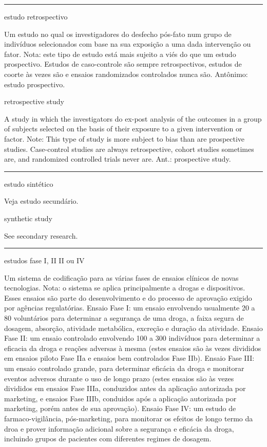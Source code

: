\documentclass[
  openany]{book}
\begin{document}
\begin{center}\rule{0.5\linewidth}{0.5pt}\end{center}

estudo retrospectivo

Um estudo no qual os investigadores do desfecho pós-fato num grupo de indivíduos selecionados com base na sua exposição a uma dada intervenção ou fator. Nota: este tipo de estudo está mais sujeito a viés do que um estudo prospectivo. Estudos de caso-controle são sempre retrospectivos, estudos de coorte às vezes são e ensaios randomizados controlados nunca são. Antônimo: estudo prospectivo.

retrospective study

A study in which the investigators do ex-post analysis of the outcomes in a group of subjects selected on the basis of their exposure to a given intervention or factor. Note: This type of study is more subject to bias than are prospective studies. Case-control studies are always retrospective, cohort studies sometimes are, and randomized controlled trials never are. Ant.: prospective study.

\begin{center}\rule{0.5\linewidth}{0.5pt}\end{center}

estudo sintético

Veja estudo secundário.

synthetic study

See secondary research.

\begin{center}\rule{0.5\linewidth}{0.5pt}\end{center}

estudos fase I, II II ou IV

Um sistema de codificação para as várias fases de ensaios clínicos de novas tecnologias. Nota: o sistema se aplica principalmente a drogas e dispositivos. Esses ensaios são parte do desenvolvimento e do processo de aprovação exigido por agências regulatórias. Ensaio Fase I: um ensaio envolvendo usualmente 20 a 80 voluntários para determinar a segurança de uma droga, a faixa segura de dosagem, absorção, atividade metabólica, excreção e duração da atividade. Ensaio Fase II: um ensaio controlado envolvendo 100 a 300 indivíduos para determinar a eficacia da droga e reações adversas à mesma (estes ensaios são às vezes divididos em ensaios piloto Fase IIa e ensaios bem controlados Fase IIb). Ensaio Fase III: um ensaio controlado grande, para determinar eficácia da droga e monitorar eventos adversos durante o uso de longo prazo (estes ensaios são às vezes divididos em ensaios Fase IIIa, conduzidos antes da aplicação autorizada por marketing, e ensaios Fase IIIb, conduidos após a aplicação autorizada por marketing, porém antes de sua aprovação). Ensaio Fase IV: um estudo de farmaco-vigilância, pós-marketing, para monitorar os efeitos de longo termo da droa e prover informação adicional sobre a segurança e eficácia da droga, incluindo grupos de pacientes com diferentes regimes de dosagem.
\end{document}
